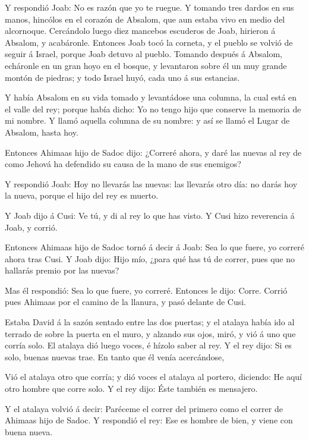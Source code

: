  Y respondió Joab: No es razón que yo te ruegue. Y tomando
tres dardos en sus manos, hincólos en el corazón de Absalom, que aun
estaba vivo en medio del alcornoque.  Cercándolo luego diez
mancebos escuderos de Joab, hirieron á Absalom, y acabáronle.
 Entonces Joab tocó la corneta, y el pueblo se volvió de
seguir á Israel, porque Joab detuvo al pueblo.  Tomando
después á Absalom, echáronle en un gran hoyo en el bosque, y levantaron
sobre él un muy grande montón de piedras; y todo Israel huyó, cada uno á
sus estancias.

 Y había Absalom en su vida tomado y levantádose una
columna, la cual está en el valle del rey; porque había dicho: Yo no
tengo hijo que conserve la memoria de mi nombre. Y llamó aquella columna
de su nombre: y así se llamó el Lugar de Absalom, hasta hoy.

 Entonces Ahimaas hijo de Sadoc dijo: ¿Correré ahora, y
daré las nuevas al rey de como Jehová ha defendido su causa de la mano
de sus enemigos?

 Y respondió Joab: Hoy no llevarás las nuevas: las llevarás
otro día: no darás hoy la nueva, porque el hijo del rey es muerto.

 Y Joab dijo á Cusi: Ve tú, y di al rey lo que has visto. Y
Cusi hizo reverencia á Joab, y corrió.

 Entonces Ahimaas hijo de Sadoc tornó á decir á Joab: Sea
lo que fuere, yo correré ahora tras Cusi. Y Joab dijo: Hijo mío, ¿para
qué has tú de correr, pues que no hallarás premio por las nuevas?

 Mas él respondió: Sea lo que fuere, yo correré. Entonces
le dijo: Corre. Corrió pues Ahimaas por el camino de la llanura, y pasó
delante de Cusi.

 Estaba David á la sazón sentado entre las dos puertas; y
el atalaya había ido al terrado de sobre la puerta en el muro, y alzando
sus ojos, miró, y vió á uno que corría solo.  El atalaya
dió luego voces, é hízolo saber al rey. Y el rey dijo: Si es solo,
buenas nuevas trae. En tanto que él venía acercándose,

 Vió el atalaya otro que corría; y dió voces el atalaya al
portero, diciendo: He aquí otro hombre que corre solo. Y el rey dijo:
Éste también es mensajero.

 Y el atalaya volvió á decir: Paréceme el correr del
primero como el correr de Ahimaas hijo de Sadoc. Y respondió el rey: Ese
es hombre de bien, y viene con buena nueva.

